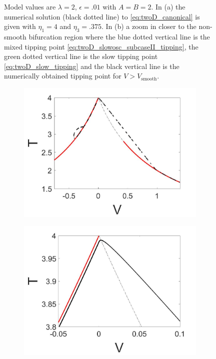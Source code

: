 \begin{figure}[H]
\begin{subfigure}{.5\textwidth}
 \caption{}
\end{subfigure}
\caption{ Model values are $\lambda=2$, $\epsilon=.01$ with $A=B=2$. In (a) the numerical solution (black dotted line) to \eqref{eq:twoD_canonical} is given with $\eta_1=4$ and $\eta_3=.375$. In (b) a zoom in closer to the non-smooth bifurcation region where the blue dotted vertical line is the mixed tipping point \eqref{eq:twoD_slowosc_subcaseII_tipping}, the green dotted vertical line is the slow tipping point \eqref{eq:twoD_slow_tipping} and the black vertical line is the numerically obtained tipping point for $V>V_{\text{smooth}}$.}
\label{fig:twoD_slowosc_Vnumerics_large}
\end{figure}

\begin{figure}[H]
\centering
\begin{subfigure}{.5\textwidth}
 \centering
 \includegraphics[width=\linewidth]{twoD/slowosc_Tplot_large.jpg}
 \caption{}
\end{subfigure}%
\begin{subfigure}{.5\textwidth}
 \centering
 \includegraphics[width=\linewidth]{twoD/slowosc_Tplot_large_zoom.jpg}

\end{subfigure}
\end{figure}
